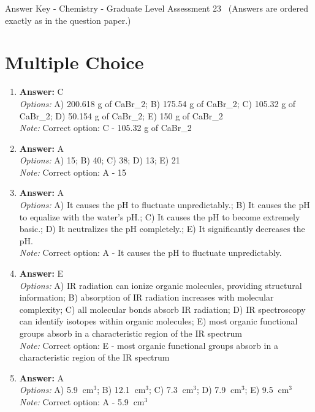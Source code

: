 \documentclass[12pt]{article}
\begin{document}
\begin{center}
Answer Key - Chemistry - Graduate Level Assessment 23 \
\small (Answers are ordered exactly as in the question paper.)
\end{center}

\section*{Multiple Choice}
\begin{enumerate}[label=\arabic*.]
\item \textbf{Answer:} C
\\ \textit{Options:} A) 200.618 g of CaBr\_2; B) 175.54 g of CaBr\_2; C) 105.32 g of CaBr\_2; D) 50.154 g of CaBr\_2; E) 150 g of CaBr\_2
\\ \textit{Note:} Correct option: C - 105.32 g of CaBr\_2
\item \textbf{Answer:} A
\\ \textit{Options:} A) 15; B) 40; C) 38; D) 13; E) 21
\\ \textit{Note:} Correct option: A - 15
\item \textbf{Answer:} A
\\ \textit{Options:} A) It causes the pH to fluctuate unpredictably.; B) It causes the pH to equalize with the water's pH.; C) It causes the pH to become extremely basic.; D) It neutralizes the pH completely.; E) It significantly decreases the pH.
\\ \textit{Note:} Correct option: A - It causes the pH to fluctuate unpredictably.
\item \textbf{Answer:} E
\\ \textit{Options:} A) IR radiation can ionize organic molecules, providing structural information; B) absorption of IR radiation increases with molecular complexity; C) all molecular bonds absorb IR radiation; D) IR spectroscopy can identify isotopes within organic molecules; E) most organic functional groups absorb in a characteristic region of the IR spectrum
\\ \textit{Note:} Correct option: E - most organic functional groups absorb in a characteristic region of the IR spectrum
\item \textbf{Answer:} A
\\ \textit{Options:} A) 5.9 $\mathrm{~cm}^3$; B) 12.1 $\mathrm{~cm}^3$; C) 7.3 $\mathrm{~cm}^3$; D) 7.9 $\mathrm{~cm}^3$; E) 9.5 $\mathrm{~cm}^3$
\\ \textit{Note:} Correct option: A - 5.9 $\mathrm{~cm}^3$
\end{enumerate}
\end{document}
